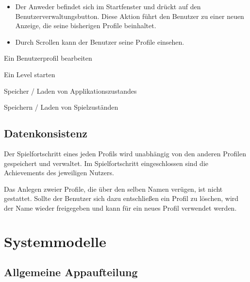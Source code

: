 \documentclass{scrartcl}
\begin{document}
\begin{telist}
	\begin{itemize}
		\item Der Anweder befindet sich im Startfenster und drückt auf den \glqq Benutzerverwaltungsbutton\grqq. Diese Aktion führt den Benutzer zu einer neuen Anzeige, die seine bisherigen Profile beinhaltet.
		\item Durch Scrollen kann der Benutzer seine Profile einsehen. 
	\end{itemize}
	\item Ein Benutzerprofil bearbeiten
	\item Ein Level starten
	\item Speicher / Laden von Applikationszustandes
	\item Speichern / Laden von Spielzuständen
	
	\item 
\end{telist}

\subsection{Datenkonsistenz}

\begin{telist}[resume]
	\item Der Spielfortschritt eines jeden Profils wird unabhängig von den anderen Profilen gespeichert und verwaltet. Im Spielfortschritt eingeschlossen sind die Achievements des jeweiligen Nutzers.
	\item Das Anlegen zweier Profile, die über den selben Namen verügen, ist nicht gestattet. Sollte der Benutzer sich dazu entschließen ein Profil zu löschen, wird der Name wieder freigegeben und kann für ein neues Profil verwendet werden.
\end{telist}

\clearpage











\section{Systemmodelle}

\subsection{Allgemeine Appaufteilung}
\end{document}
